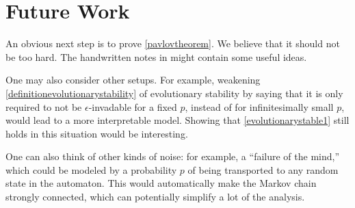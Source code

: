 \documentclass[12pt]{article}
\theoremstyle{definition}
\newtheorem{lemma}[theorem]{Lemma}
\theoremstyle{remark}
\begin{document}
    \section{Future Work}
    \label{sectiondiscussion}

    An obvious next step is to prove \cref{pavlovtheorem}. We believe that it should not be too hard. The handwritten notes in \cite{arvid2020} might contain some useful ideas.

    One may also consider other setups. For example, weakening \cref{definitionevolutionarystability} of evolutionary stability by saying that it is only required to not be $\epsilon$-invadable for a fixed $p$, instead of for infinitesimally small $p$, would lead to a more interpretable model. Showing that \cref{evolutionarystable1} still holds in this situation would be interesting.
    
    One can also think of other kinds of noise: for example, a ``failure of the mind,'' which could be modeled by a probability $p$ of being transported to any random state in the automaton. This would automatically make the Markov chain strongly connected, which can potentially simplify a lot of the analysis.







\end{document}

